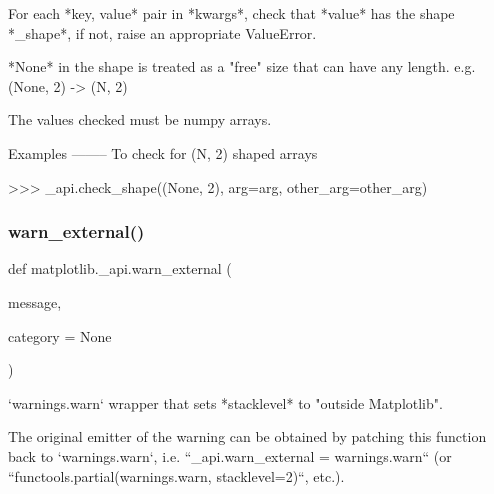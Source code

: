 \begin{DoxyVerb}For each *key, value* pair in *kwargs*, check that *value* has the shape
*_shape*, if not, raise an appropriate ValueError.

*None* in the shape is treated as a "free" size that can have any length.
e.g. (None, 2) -> (N, 2)

The values checked must be numpy arrays.

Examples
--------
To check for (N, 2) shaped arrays

>>> _api.check_shape((None, 2), arg=arg, other_arg=other_arg)
\end{DoxyVerb}
 \mbox{\label{namespacematplotlib_1_1__api_ac668a8e9e8326aa746760038c8e264fa}} 
\subsubsection{\texorpdfstring{warn\+\_\+external()}{warn\_external()}}
{\footnotesize\ttfamily def matplotlib.\+\_\+api.\+warn\+\_\+external (\begin{DoxyParamCaption}\item[{}]{message,  }\item[{}]{category = {\ttfamily None} }\end{DoxyParamCaption})}

\begin{DoxyVerb}`warnings.warn` wrapper that sets *stacklevel* to "outside Matplotlib".

The original emitter of the warning can be obtained by patching this
function back to `warnings.warn`, i.e. ``_api.warn_external =
warnings.warn`` (or ``functools.partial(warnings.warn, stacklevel=2)``,
etc.).
\end{DoxyVerb}
 